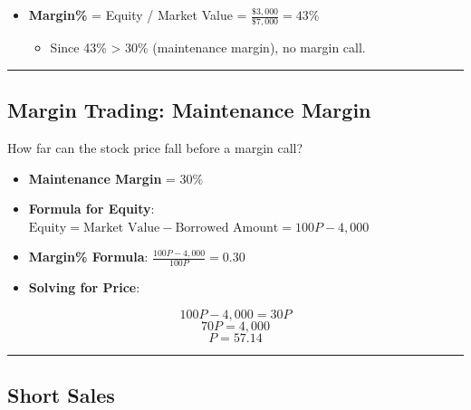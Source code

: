 \documentclass[
  letterpaper,
  DIV=11,
  numbers=noendperiod]{scrartcl}
\providecommand{\tightlist}{%
  \setlength{\itemsep}{0pt}\setlength{\parskip}{0pt}}\usepackage{longtable,booktabs,array}
\begin{document}
\begin{itemize}
\tightlist
\item
  \textbf{Margin\%} = Equity / Market Value =
  \(\frac{\$3,000}{\$7,000} = 43\%\)

  \begin{itemize}
  \tightlist
  \item
    Since 43\% \textgreater{} 30\% (maintenance margin), no margin call.
  \end{itemize}
\end{itemize}

\begin{center}\rule{0.5\linewidth}{0.5pt}\end{center}

\subsection{Margin Trading: Maintenance
Margin}\label{margin-trading-maintenance-margin}

How far can the stock price fall before a margin call?

\begin{itemize}
\item
  \textbf{Maintenance Margin} = 30\%
\item
  \textbf{Formula for Equity}:
  \(\text{Equity} = \text{Market Value} - \text{Borrowed Amount} = 100P - 4,000\)
\item
  \textbf{Margin\% Formula}: \(\frac{100P - 4,000}{100P} = 0.30\)
\item
  \textbf{Solving for Price}:
\end{itemize}

\[100P - 4,000 = 30P\] \[70P = 4,000\] \[P = 57.14\]

\begin{center}\rule{0.5\linewidth}{0.5pt}\end{center}

\subsection{Short Sales}\label{short-sales}
\end{document}
